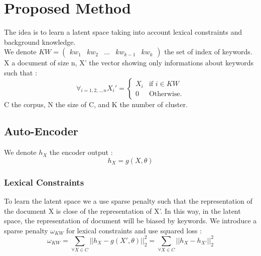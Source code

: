 \section{Proposed Method}
The idea is to learn a latent space taking into account lexical constraints and
background knowledge.
\\We denote $KW = \begin{pmatrix} kw_1 & kw_2 & ... & kw_{k-1} & kw_{k}
\end {pmatrix}$
the set of index of keywords. X a document of size n,
X' the vector showing only informations about keywords such that :
\begin{equation*}
\forall_{i=1,2,..,n}X_i' = \left\{
\begin{array}{ll}
  X_i & \mbox{if } i \in KW \\
  0 & \mbox{Otherwise.}
\end{array}
\right.
\end{equation*}
C the corpus, N the size of C, and K the number of cluster.
\subsection{Auto-Encoder}
We denote $h_X$ the encoder output : 
\begin{equation}\label{eq:h}
  h_X = g(X,\theta)
\end{equation}
\subsubsection{Lexical Constraints}
To learn the latent space we a use sparse penalty such that the representation
of the document X is close of the representation of X'. In this way, in the
latent space, the representation of document will be biased by keywords.
We introduce a sparse penalty $\omega_{KW}$ for lexical constraints and
use squared loss : 
\begin{equation}\label{eq:omega1}
  \omega_{KW} = \sum_{\forall{X\in C}} || h_X - g(X',\theta) ||_2^2 =
  \sum_{\forall{X\in C}} || h_X - h_{X'}||_2^2
\end{equation}
